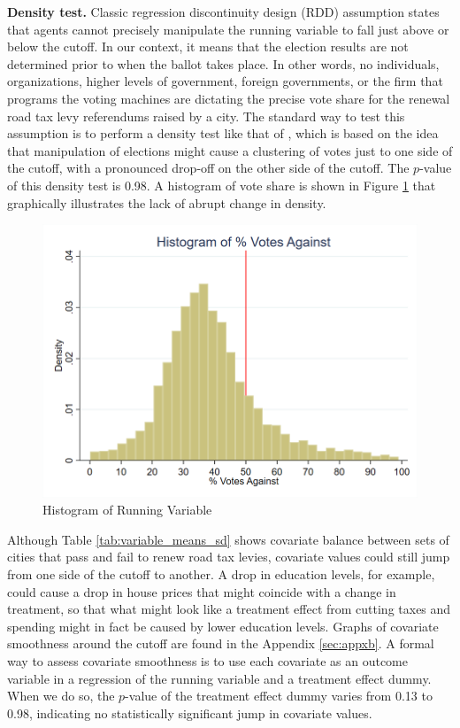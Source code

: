 {\bf Density test.} Classic regression discontinuity design (RDD) assumption states that agents cannot precisely manipulate the running variable to fall just above or below the cutoff. In our context, it means that the election results are not determined prior to when the ballot takes place. In other words, no individuals, organizations, higher levels of government, foreign governments, or the firm that programs the voting machines are dictating the precise vote share for the renewal road tax levy referendums raised by a city. The standard way to test this assumption is to perform a density test like that of \cite{cattaneo2020simple}, which is based on the idea that manipulation of elections might cause a clustering of votes just to one side of the cutoff, with a pronounced drop-off on the other side of the cutoff. The $p$-value of this density test is 0.98. A histogram of vote share is shown in Figure \ref{fig:running_var_hist} that graphically illustrates the lack of abrupt change in density.

\begin{figure}[ht]
    \centering
    \includegraphics[width=\textwidth,keepaspectratio]{images/votes_pct_against_histogram.png}
    \caption{Histogram of Running Variable}
    \label{fig:running_var_hist}
\end{figure}

Although Table \ref{tab:variable_means_sd} shows covariate balance between sets of cities that pass and fail to renew road tax levies, covariate values could still jump from one side of the cutoff to another. A drop in education levels, for example, could cause a drop in house prices that might coincide with a change in treatment, so that what might look like a treatment effect from cutting taxes and spending might in fact be caused by lower education levels. Graphs of covariate smoothness around the cutoff are found in the Appendix \ref{sec:appxb}. A formal way to assess covariate smoothness is to use each covariate as an outcome variable in a regression of the running variable and a treatment effect dummy. When we do so, the $p$-value of the treatment effect dummy varies from 0.13 to 0.98, indicating no statistically significant jump in covariate values. 

